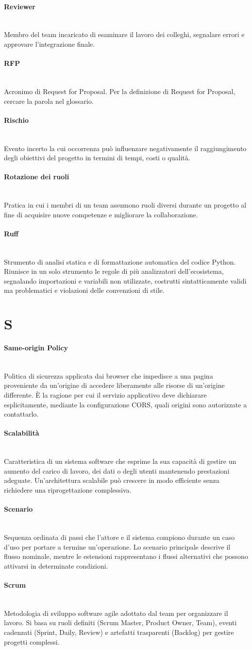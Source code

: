 \documentclass[a4paper, 10pt, colorlinks=true, linkcolor=black, urlcolor=blue, citecolor=blue, hidelinks]{article}
\newcommand{\glossaryterm}[2]{
    \paragraph{#1 \label{term:#1}} \mbox{} \\
    #2
    \vspace{0.5em}
}
\begin{document}
\glossaryterm{Reviewer}{Membro del team incaricato di esaminare il lavoro dei colleghi, segnalare errori e approvare l'integrazione finale.}

\glossaryterm{RFP}{Acronimo di Request for Proposal. Per la definizione di Request for Proposal, cercare la parola nel glossario.}

\glossaryterm{Rischio}{Evento incerto la cui occorrenza può influenzare negativamente il raggiungimento degli obiettivi del progetto in termini di tempi, costi o qualità.}

\glossaryterm{Rotazione dei ruoli}{Pratica in cui i membri di un team assumono ruoli diversi durante un progetto al fine di acquisire nuove competenze e migliorare la collaborazione.}

\glossaryterm{Ruff}{Strumento di analisi statica e di formattazione automatica del codice Python. Riunisce in un solo strumento le regole di più analizzatori dell'ecosistema, segnalando importazioni e variabili non utilizzate, costrutti sintatticamente validi ma problematici e violazioni delle convenzioni di stile.}

\newpage

\section*{S}

\glossaryterm{Same-origin Policy}{Politica di sicurezza applicata dai browser che impedisce a una pagina proveniente da un'origine di accedere liberamente alle risorse di un'origine differente. È la ragione per cui il servizio applicativo deve dichiarare esplicitamente, mediante la configurazione CORS, quali origini sono autorizzate a contattarlo.}

\glossaryterm{Scalabilità}{Caratteristica di un sistema software che esprime la sua capacità di gestire un aumento del carico di lavoro, dei dati o degli utenti mantenendo prestazioni adeguate. Un'architettura scalabile può crescere in modo efficiente senza richiedere una riprogettazione complessiva.}

\glossaryterm{Scenario}{Sequenza ordinata di passi che l'attore e il sistema compiono durante un caso d'uso per portare a termine un'operazione. Lo scenario principale descrive il flusso nominale, mentre le estensioni rappresentano i flussi alternativi che possono attivarsi in determinate condizioni.}

\glossaryterm{Scrum}{Metodologia di sviluppo software agile adottato dal team per organizzare il lavoro. Si basa su ruoli definiti (Scrum Master, Product Owner, Team), eventi cadenzati (Sprint, Daily, Review) e artefatti trasparenti (Backlog) per gestire progetti complessi.}
\end{document}
